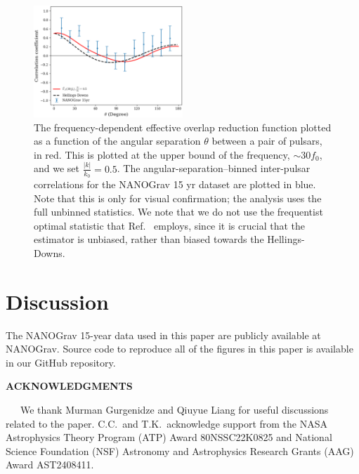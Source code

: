 \documentclass[prd,aps,psfig,nofootinbib,nobibnotes,superscriptaddress,preprintnumbers,times]{revtex4-2}\setlength{\topmargin}{-14mm}
\begin{document}
\begin{figure}[h]
    \centering
    \includegraphics[width=0.5\textwidth]{fig1.pdf}
    \caption{The frequency-dependent effective overlap reduction function plotted as a function of the angular separation $\theta$ between a pair of pulsars, in red. This is plotted at the upper bound of the frequency, $\sim 30f_0$, and we set $\frac{|k|}{k_0} = 0.5$. The angular-separation–binned inter-pulsar correlations for the NANOGrav 15 yr dataset are plotted in blue. Note that this is only for visual confirmation; the analysis uses the full unbinned statistics. We note that we do not use the frequentist optimal statistic that Ref.\ \cite{Agazie:2023} employs, since it is crucial that the estimator is unbiased, rather than biased towards the Hellings-Downs.} 
    \label{fig:orf}
\end{figure}

\section{Discussion}\label{sec:discussion}


\vspace{3mm}
The NANOGrav 15-year data used in this paper are publicly available at NANOGrav. Source code to reproduce all of the figures in this paper is available in our GitHub repository.

\begin{center}
    \textbf{ACKNOWLEDGMENTS}    
\end{center}
\ \ \ We thank Murman Gurgenidze and Qiuyue Liang for useful discussions related to the paper. C.C.\ and T.K.\ acknowledge support from the NASA Astrophysics Theory Program (ATP) Award 80NSSC22K0825 and  National Science Foundation (NSF) Astronomy and Astrophysics Research Grants (AAG) Award AST2408411.




\clearpage
\end{document}
